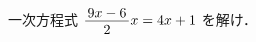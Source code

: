 \documentclass[../../../../hsm_tok_q.tex]{subfiles}
\begin{document}
    
    一次方程式 \;$\myfraca{9x-6}{2}x = 4x + 1$\; を解け．
\end{document}
